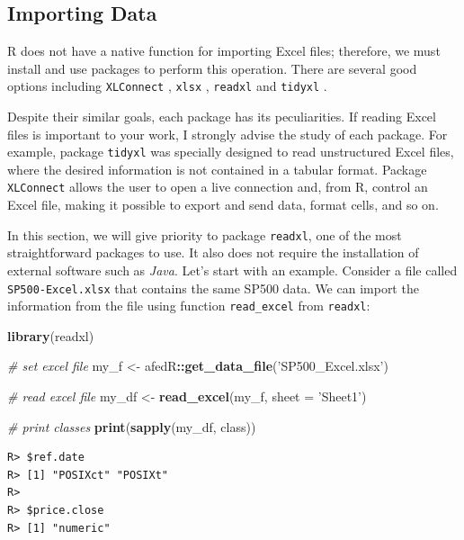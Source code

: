 \documentclass[
  12pt,
]{book}
\newenvironment{Shaded}{\begin{snugshade}}{\end{snugshade}}
\newcommand{\CommentTok}[1]{\textcolor[rgb]{0.37,0.37,0.37}{\textit{#1}}}
\newcommand{\DataTypeTok}[1]{\textcolor[rgb]{0.27,0.27,0.27}{#1}}
\newcommand{\KeywordTok}[1]{\textcolor[rgb]{0.27,0.27,0.27}{\textbf{#1}}}
\newcommand{\NormalTok}[1]{#1}
\newcommand{\OperatorTok}[1]{\textcolor[rgb]{0.43,0.43,0.43}{\textbf{#1}}}
\newcommand{\StringTok}[1]{\textcolor[rgb]{0.5,0.5,0.5}{#1}}
\begin{document}
\hypertarget{importing-data-1}{%
\subsection{Importing Data}\label{importing-data-1}}

R does not have a native function for importing Excel files; therefore, we must install and use packages to perform this operation. There are several good options including \texttt{XLConnect} \citep{R-XLConnect}, \texttt{xlsx} \citep{R-xlsx}, \texttt{readxl} \citep{R-readxl} and \texttt{tidyxl} \citep{R-tidyxl}.   

Despite their similar goals, each package has its peculiarities. If reading Excel files is important to your work, I strongly advise the study of each package. For example, package \texttt{tidyxl} was specially designed to read unstructured Excel files, where the desired information is not contained in a tabular format. Package \texttt{XLConnect} allows the user to open a live connection and, from R, control an Excel file, making it possible to export and send data, format cells, and so on.

In this section, we will give priority to package \texttt{readxl}, one of the most straightforward packages to use. It also does not require the installation of external software such as \emph{Java}. Let's start with an example. Consider a file called \texttt{SP500-Excel.xlsx} that contains the same SP500 data. We can import the information from the file using function \texttt{read\_excel} from \texttt{readxl}: 

\begin{Shaded}
\begin{Highlighting}[]
\KeywordTok{library}\NormalTok{(readxl)}

\CommentTok{# set excel file}
\NormalTok{my_f <-}\StringTok{ }\NormalTok{afedR}\OperatorTok{::}\KeywordTok{get_data_file}\NormalTok{(}\StringTok{'SP500_Excel.xlsx'}\NormalTok{)}

\CommentTok{# read excel file }
\NormalTok{my_df <-}\StringTok{ }\KeywordTok{read_excel}\NormalTok{(my_f, }\DataTypeTok{sheet =} \StringTok{'Sheet1'}\NormalTok{)}

\CommentTok{# print classes}
\KeywordTok{print}\NormalTok{(}\KeywordTok{sapply}\NormalTok{(my_df, class))}
\end{Highlighting}
\end{Shaded}

\begin{verbatim}
R> $ref.date
R> [1] "POSIXct" "POSIXt" 
R> 
R> $price.close
R> [1] "numeric"
\end{verbatim}
\end{document}
